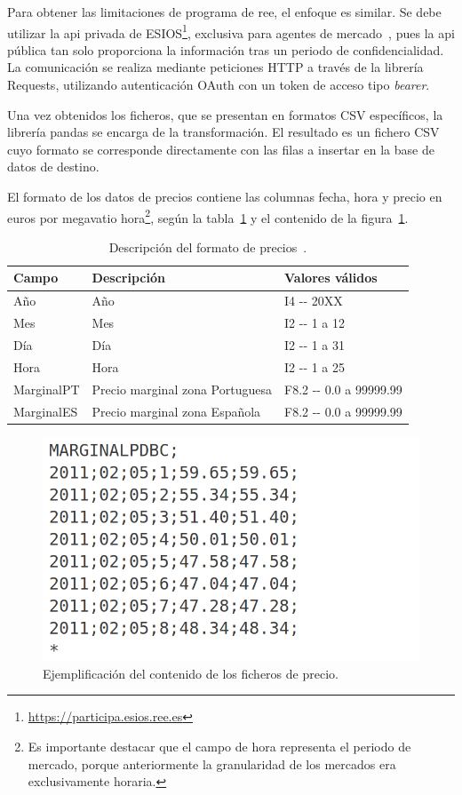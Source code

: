 Para obtener las limitaciones de programa de \gls{ree}, el enfoque es similar. Se debe utilizar la \gls{api} privada de ESIOS\footnote{\url{https://participa.esios.ree.es}}, exclusiva para agentes de mercado~\cite{red2025esios}, pues la \gls{api} pública tan solo proporciona la información tras un periodo de confidencialidad. La comunicación se realiza mediante peticiones HTTP a través de la librería Requests, utilizando autenticación OAuth con un token de acceso tipo \textit{bearer}.

Una vez obtenidos los ficheros, que se presentan en formatos CSV específicos, la librería pandas se encarga de la transformación. El resultado es un fichero CSV cuyo formato se corresponde directamente con las filas a insertar en la base de datos de destino.

El formato de los datos de precios contiene las columnas fecha, hora y precio en euros por megavatio hora\footnote{Es importante destacar que el campo de hora representa el periodo de mercado, porque anteriormente la granularidad de los mercados era exclusivamente horaria.}, según la tabla~\ref{tab:descripción-precio} y el contenido de la figura~\ref{fig:contenido-precio}.

\begin{table}[ht]
  \centering
  \begin{tabular}{|l|p{7.5cm}|l|}
    \hline
    Campo      & Descripción                     & Valores válidos            \\
    \hline
    Año        & Año                             & I4 {-}{-} 20XX             \\
    Mes        & Mes                             & I2 {-}{-} 1 a 12           \\
    Día        & Día                             & I2 {-}{-} 1 a 31           \\
    Hora       & Hora                            & I2 {-}{-} 1 a 25           \\
    MarginalPT & Precio marginal zona Portuguesa & F8.2 {-}{-} 0.0 a 99999.99 \\
    MarginalES & Precio marginal zona Española   & F8.2 {-}{-} 0.0 a 99999.99 \\
    \hline
  \end{tabular}
  \caption[Descripción del formato de precios.]{Descripción del formato de precios~\cite{omie2025modelo}.}%
  \label{tab:descripción-precio}
\end{table}

\begin{figure}
  \centering
  \includegraphics[width=0.5\linewidth]{figures/contenido-precio.png}
  \caption[Ejemplificación del contenido de los ficheros de precio.]{Ejemplificación del contenido de los ficheros de precio.}%
  \label{fig:contenido-precio}
\end{figure}

